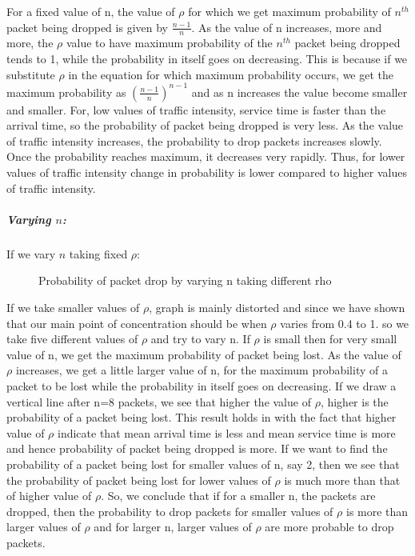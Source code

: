 For a fixed value of n, the value of $\rho$ for which we get maximum probability of $n^{th}$ packet being dropped is given by  $\frac{n-1}{n}$. As the value of n increases, more and more, the $\rho$ value to have maximum probability of the $n^{th}$ packet being dropped tends to 1, while the probability in itself goes on decreasing. This is because if we substitute $\rho$ in the equation for which maximum probability occurs, we get the maximum probability as ${(\frac{n-1}{n})}^{n-1}$ and as n increases the value become smaller and smaller. For, low values of traffic intensity, service time is faster than the arrival time, so the probability of packet being dropped is very less. As the value of traffic intensity increases, the probability to drop packets increases slowly. Once the probability reaches maximum, it decreases very rapidly. Thus, for lower values of traffic intensity change in probability is lower compared to higher values of traffic intensity. 
\subparagraph{Varying $n$:}If we vary $n$ taking fixed $\rho:$

\begin{figure}[H]
		\centering
		\caption{{Probability of packet drop by varying n taking different rho}}
		\label{fig:figd}
\end{figure}

If we take smaller values of $\rho$, graph is mainly distorted and since we have shown that our main point of concentration should be when $\rho$ varies from 0.4 to 1. so we take five different values of $\rho$ and try to vary n. If $\rho$ is small then for very small value of n, we get the maximum probability of packet being lost. As the value of $\rho$ increases, we get a little larger value of n, for the maximum probability of a packet to be lost while the probability in itself goes on decreasing. If we draw a vertical line after n=8 packets, we see that higher the value of $\rho$, higher is the probability of a packet being lost. This result holds in with the fact that higher value of $\rho$ indicate that mean arrival time is less and mean service time is more and hence probability of packet being dropped is more. If we want to find the probability of a packet being lost for smaller values of n, say 2, then we see that the probability of packet being lost for lower values of $\rho$ is much more than that of higher value of $\rho$. So, we conclude that if for a smaller n, the packets are dropped, then the probability to drop packets for smaller values of $\rho$ is more than larger values of $\rho$ and for larger n, larger values of $\rho$ are more probable to drop packets.


